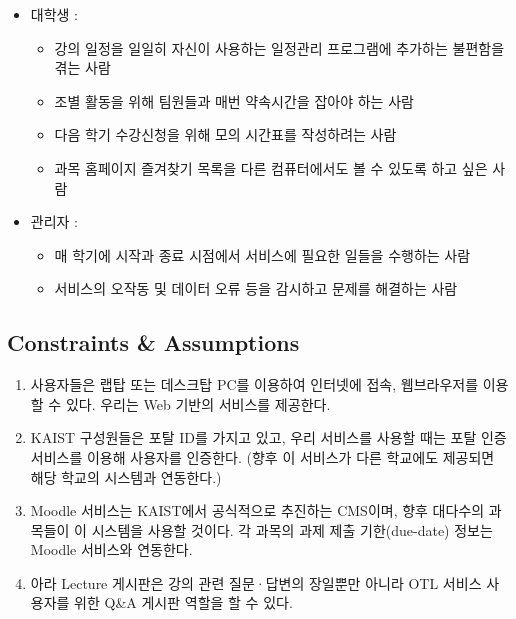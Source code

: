 \documentclass[a4paper,titlepage]{article}
\begin{document}
\begin{itemize}

	\item 대학생 :
	\begin{itemize}
		\item 강의 일정을 일일히 자신이 사용하는 일정관리 프로그램에 추가하는 불편함을 겪는 사람
		\item 조별 활동을 위해 팀원들과 매번 약속시간을 잡아야 하는 사람
		\item 다음 학기 수강신청을 위해 모의 시간표를 작성하려는 사람
		\item 과목 홈페이지 즐겨찾기 목록을 다른 컴퓨터에서도 볼 수 있도록 하고 싶은 사람
	\end{itemize}

	\item 관리자 :
	\begin{itemize}
		\item 매 학기에 시작과 종료 시점에서 서비스에 필요한 일들을 수행하는 사람
		\item 서비스의 오작동 및 데이터 오류 등을 감시하고 문제를 해결하는 사람
	\end{itemize}

\end{itemize}

\subsection{Constraints \& Assumptions}

\begin{enumerate}
	\item 사용자들은 랩탑 또는 데스크탑 PC를 이용하여 인터넷에 접속, 웹브라우저를 이용할 수 있다.
	우리는 Web 기반의 서비스를 제공한다.

	\item KAIST 구성원들은 포탈 ID를 가지고 있고, 우리 서비스를 사용할 때는 포탈 인증 서비스를 이용해 사용자를 인증한다.
	(향후 이 서비스가 다른 학교에도 제공되면 해당 학교의 시스템과 연동한다.)

	\item Moodle 서비스는 KAIST에서 공식적으로 추진하는 CMS이며, 향후 대다수의 과목들이 이 시스템을 사용할 것이다.
	각 과목의 과제 제출 기한(due-date) 정보는 Moodle 서비스와 연동한다.

	\item 아라 Lecture 게시판은 강의 관련 질문·답변의 장일뿐만 아니라 OTL 서비스 사용자를 위한 Q\&A 게시판 역할을 할 수 있다.

\end{enumerate}
\end{document}
